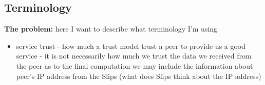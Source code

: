 \subsection{Terminology}
\textbf{The problem:} here I want to describe what terminology I'm using

\begin{itemize}
\item service trust - how much a trust model trust a peer to provide us a good service - it is not necessarily how much we trust the data we received from the peer as to the final computation we may include the information about peer's IP address from the Slips (what does Slips think about the IP address)
\end{itemize}